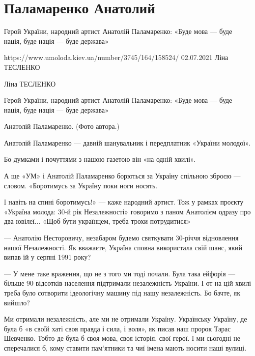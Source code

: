  
 
 
 
 
\section{Паламаренко Анатолий}

\begin{longtable}


Герой України, народний артист Анатолій Паламаренко: «Буде мова — буде нація, буде нація — буде держава»

https://www.umoloda.kiev.ua/number/3745/164/158524/
02.07.2021
Ліна ТЕСЛЕНКО

Ліна ТЕСЛЕНКО

Герой України, народний артист Анатолій Паламаренко: «Буде мова — буде нація, буде нація — буде держава»

Анатолій Паламаренко. (Фото автора.)

Анатолій Паламаренко — давній шанувальник і передплатник «України молодої».

Бо думками і почуттями з нашою газетою він «на одній хвилі».

А ще «УМ» і Анатолій Паламаренко борються за Україну спільною зброєю — словом. «Боротимусь за Україну поки ноги носять.

І навіть на спині боротимусь!» — каже народний артист. Тож у рамках проєкту «Україна молода: 30-й рік Незалежності» говоримо з паном Анатолієм одразу про два ювілеї...
«Щоб бути українцем, треба трохи потрудитися»

— Анатолію Несторовичу, незабаром  будемо святкувати 30-річчя відновлення нашої
Незалежності. Як вважаєте, Україна сповна використала свій шанс, який випав їй
у серпні 1991 року?

— У мене таке враження, що не з того ми тоді почали. Була така ейфорія — більше
90 відсотків населення підтримали незалежність України. І от на цій хвилі треба
було сотворити ідеологічну машину під нашу незалежність. Бо бачте, як вийшло?

Ми отримали незалежність, але ми не отримали Україну. Українську Україну, де
була б «в своїй хаті своя правда і сила, і воля», як писав наш пророк Тарас
Шевченко. Тобто де була б своя мова, своя історія, свої герої. І ми сьогодні не
сперечалися б, кому ставити пам’ятники та чиї імена мають носити наші вулиці.



\end{longtable}
